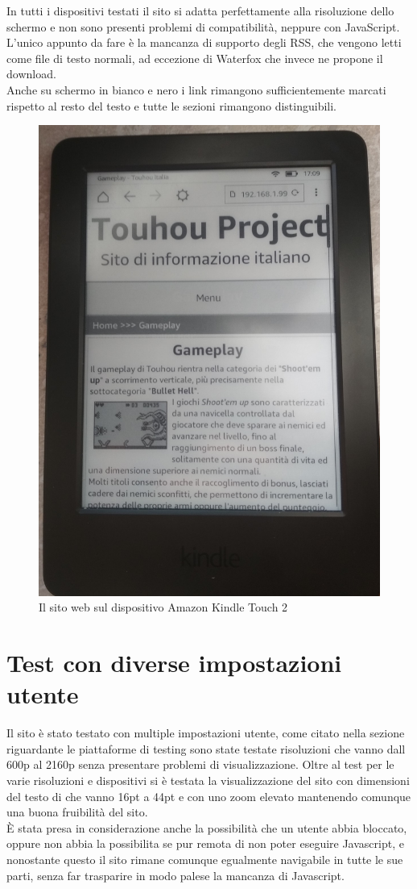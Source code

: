 \documentclass[openany, a4paper, 12pt]{report}
\begin{document}
				In tutti i dispositivi testati il sito si adatta perfettamente alla risoluzione dello schermo e non sono presenti problemi di compatibilità, neppure con JavaScript.\\
				L'unico appunto da fare è la mancanza di supporto degli RSS, che vengono letti come file di testo normali, ad eccezione di Waterfox che invece ne propone il download.\\
				Anche su schermo in bianco e nero i link rimangono sufficientemente marcati rispetto al resto del testo e tutte le sezioni rimangono distinguibili.
			
				\begin{figure}[H]
					\centering
					\includegraphics[width=0.7\linewidth]{images/Kindle}
					\caption{Il sito web sul dispositivo Amazon Kindle Touch 2}
				\end{figure}
			
		\section{Test con diverse impostazioni utente}
			Il sito è stato testato con multiple impostazioni utente, come citato nella sezione riguardante le piattaforme di testing sono state testate risoluzioni che vanno dall 600p al 2160p senza presentare problemi di visualizzazione. Oltre al test per le varie risoluzioni e dispositivi si è testata la visualizzazione del sito con dimensioni del testo di che vanno 16pt a 44pt e con uno zoom elevato mantenendo comunque una buona fruibilità del sito.\\
			\`{E} stata presa in considerazione anche la possibilità che un utente abbia bloccato, oppure non abbia la possibilita se pur remota di non poter eseguire Javascript, e nonostante questo il sito rimane comunque egualmente navigabile in tutte le sue parti, senza far trasparire in modo palese la mancanza di Javascript.\\
\end{document}
